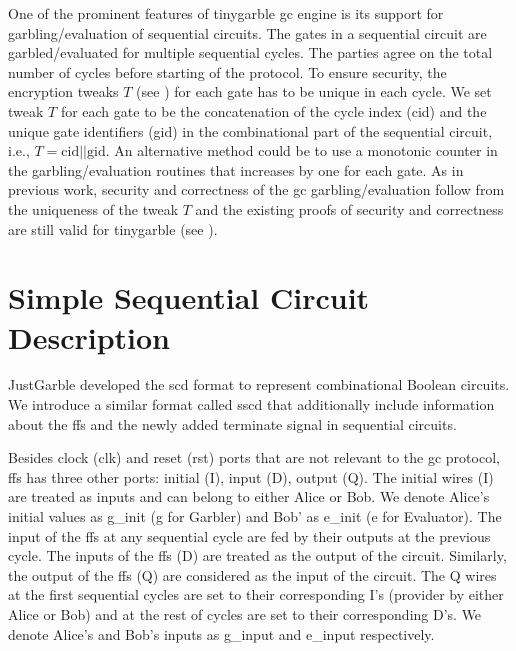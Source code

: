 One of the prominent features of \gls{tinygarble} \acrshort{gc} engine is its support for garbling/evaluation of sequential circuits.
The gates in a sequential circuit are garbled/evaluated for multiple sequential cycles.
The parties agree on the total number of cycles before starting of the protocol.
To ensure security, the encryption tweaks $T$ (see ) for each gate has to be unique in each cycle\cite[Sect. 3.4]{henecka2013faster}.
We set tweak $T$ for each gate to be the concatenation of the cycle index (cid) and the unique gate identifiers (gid) in the combinational part of the sequential circuit, i.e., $T = \textrm{cid} || \textrm{gid}$.
An alternative method could be to use a monotonic counter in the garbling/evaluation routines that increases by one for each gate.
As in previous work, security and correctness of the \acrshort{gc} garbling/evaluation follow from the uniqueness of the tweak $T$ and the existing proofs of security and correctness are still valid for \gls{tinygarble} (see \cite{lindell2009proof, bellare2013efficient, zahur2015two}).


\section{Simple Sequential Circuit Description}\label{sec:engine-sscd}
JustGarble \cite{bellare2013efficient} developed the \acrfull{scd} format to represent combinational Boolean circuits.
We introduce a similar format called \acrfull{sscd} that additionally include information about the \acrshort{ff}s and the newly added terminate signal in sequential circuits.

Besides clock (clk) and reset (rst) ports that are not relevant to the \acrshort{gc} protocol, \acrshort{ff}s has three other ports: initial (I), input (D), output (Q).
The initial wires (I) are treated as inputs and can belong to either Alice or Bob.
We denote Alice's initial values as g\_init (g for Garbler) and Bob' as e\_init (e for Evaluator).
The input of the \acrshort{ff}s at any sequential cycle are fed by their outputs at the previous cycle.
The inputs of the \acrshort{ff}s (D) are treated  as the output of the circuit.
Similarly, the output of the \acrshort{ff}s (Q) are considered as the input of the circuit.
The Q wires at the first sequential cycles are set to their corresponding I's (provider by either Alice or Bob) and at the rest of cycles are set to their corresponding D's.
We denote Alice's and Bob's inputs as g\_input and e\_input respectively.


